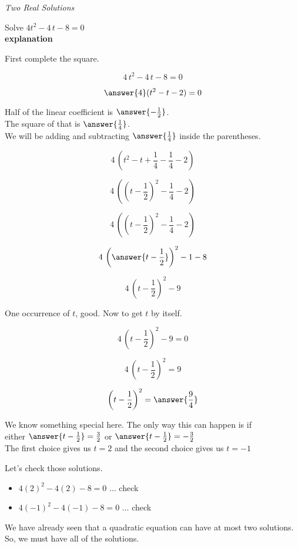\documentclass{ximera}
\begin{document}
\begin{example} \textit{Two Real Solutions}

Solve $4  t^2 - 4 \, t - 8 = 0$ \\


\textbf{explanation}


First complete the square.



\[ 4 \, t^2 -  4 \, t - 8 = 0 \]

\[ \answer{4} (t^2 - t - 2) = 0 \]



Half of the linear coefficient is $\answer{-\frac{1}{2}}$. \\

The square of that is $\answer{\frac{1}{4}}$. \\

We will be adding and subtracting $\answer{\frac{1}{4}}$ inside the parentheses.




\[ 4 \, (t^2 - t + \frac{1}{4} - \frac{1}{4} - 2)  \]


\[ 4 \, \left(\left(t - \frac{1}{2}\right)^2 - \frac{1}{4} - 2\right)  \]


\[ 4 \, \left(\left(t - \frac{1}{2}\right)^2 - \frac{1}{4} - 2\right)  \]

\[ 4 \, \left( \answer{t - \frac{1}{2}} \right)^2 - 1 - 8  \]

\[ 4 \, \left(t - \frac{1}{2}\right)^2 - 9  \]


One occurrence of $t$, good. Now to get $t$ by itself.

\[ 4 \, \left(t - \frac{1}{2}\right)^2 - 9 = 0  \]

\[ 4 \, \left(t - \frac{1}{2}\right)^2 = 9  \]

\[  \left(t - \frac{1}{2}\right)^2 = \answer{\frac{9}{4}}  \]

We know something special here. The only way this can happen is if \\



either   $\answer{t - \frac{1}{2}} = \frac{3}{2}$  or  $\answer{t - \frac{1}{2}} = -\frac{3}{2}$ \\

The first choice gives us $t = 2$ and the second choice gives us $t = -1$




Let's check those solutions.

\begin{itemize}
\item $4 (2)^2 - 4 (2) - 8 = 0$ ... check
\item $4 (-1)^2 - 4 (-1) - 8 = 0$ ... check
\end{itemize}



We have already seen that a quadratic equation can have at most two solutions.  So, we must have all of the solutions.




\end{example}
\end{document}
